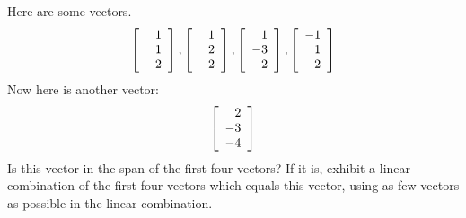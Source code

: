 \begin{enumialphparenastyle}
\begin{ex} Here are some vectors. 
\begin{equation*}
\left[ 
\begin{array}{r}
1 \\ 
1 \\ 
-2
\end{array}
\right] ,\left[ 
\begin{array}{r}
1 \\ 
2 \\ 
-2
\end{array}
\right] ,\left[ 
\begin{array}{r}
1 \\ 
-3 \\ 
-2
\end{array}
\right] ,\left[ 
\begin{array}{r}
-1 \\ 
1 \\ 
2
\end{array}
\right]
\end{equation*}
Now here is another vector:\ 
\begin{equation*}
\left[ 
\begin{array}{r}
2 \\ 
-3 \\ 
-4
\end{array}
\right] 
\end{equation*}
Is this vector in the span of the first four vectors? If it is, exhibit a
linear combination of the first four vectors which equals this vector, using
as few vectors as possible in the linear combination. 
\end{ex}


\end{enumialphparenastyle}
